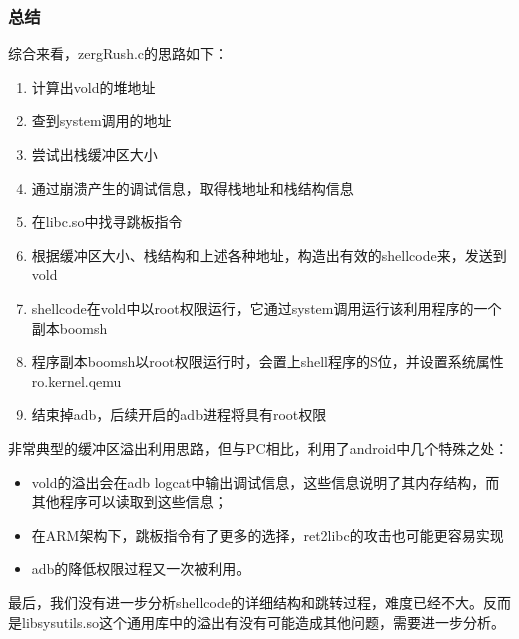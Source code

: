 \subsubsection{总结}

综合来看，zergRush.c的思路如下：
\begin{enumerate}
\item 计算出vold的堆地址
\item 查到system调用的地址
\item 尝试出栈缓冲区大小
\item 通过崩溃产生的调试信息，取得栈地址和栈结构信息
\item 在libc.so中找寻跳板指令
\item 根据缓冲区大小、栈结构和上述各种地址，构造出有效的shellcode来，发送到vold
\item shellcode在vold中以root权限运行，它通过system调用运行该利用程序的一个副本boomsh
\item 程序副本boomsh以root权限运行时，会置上shell程序的S位，并设置系统属性ro.kernel.qemu
\item 结束掉adb，后续开启的adb进程将具有root权限
\end{enumerate}

非常典型的缓冲区溢出利用思路，但与PC相比，利用了android中几个特殊之处：
\begin{itemize}
\item vold的溢出会在adb logcat中输出调试信息，这些信息说明了其内存结构，而其他程序可以读取到这些信息；
\item 在ARM架构下，跳板指令有了更多的选择，ret2libc的攻击也可能更容易实现
\item adb的降低权限过程又一次被利用。
\end{itemize}

最后，我们没有进一步分析shellcode的详细结构和跳转过程，难度已经不大。反而是libsysutils.so这个通用库中的溢出有没有可能造成其他问题，需要进一步分析。

